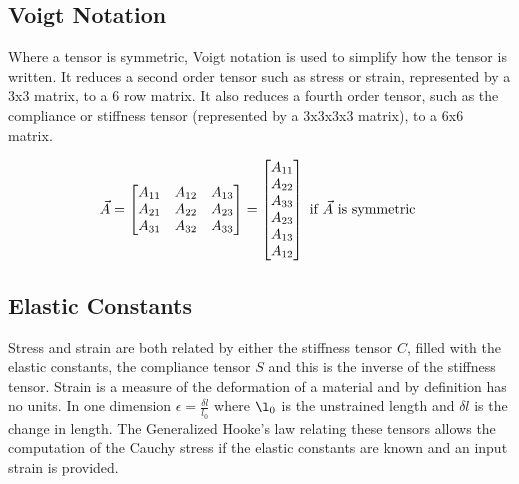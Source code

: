 \FloatBarrier
\subsection{Voigt Notation}

Where a tensor is symmetric, Voigt notation is used to simplify how the tensor is written.  It reduces a second order tensor such as stress or strain, represented by a 3x3 matrix, to a 6 row matrix.  It also reduces a fourth order tensor, such as the compliance or stiffness tensor (represented by a 3x3x3x3 matrix), to a 6x6 matrix. 


\begin{equation}
\begin{split}
\vec{A} =
\begin{bmatrix}
A_{11} & A_{12} & A_{13}   \\
A_{21} & A_{22} & A_{23}   \\
A_{31} & A_{32} & A_{33}   \\
\end{bmatrix}
= 
\begin{bmatrix}
A_{11} \\
A_{22} \\
A_{33} \\
A_{23} \\
A_{13} \\
A_{12} \\
\end{bmatrix}
\textnormal{  if } \vec{A}  \textnormal{ is symmetric }
\end{split}
\label{eq:voigtexample}
\end{equation}



\subsection{Elastic Constants}

Stress and strain are both related by either the stiffness tensor $C$, filled with the elastic constants, the compliance tensor $S$ and this is the inverse of the stiffness tensor.  Strain is a measure of the deformation of a material and by definition has no units.  In one dimension $\epsilon = \frac{\delta l}{l_0}$ where $\l_0$ is the unstrained length and $\delta l$ is the change in length.  The Generalized Hooke's law relating these tensors allows the computation of the Cauchy stress if the elastic constants are known and an input strain is provided.

